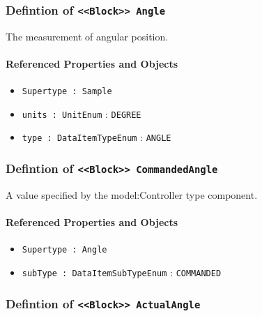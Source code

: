 \subsubsection{Defintion of \texttt{<<Block>> Angle}}
  \label{type:Angle}

\FloatBarrier

The measurement of angular position.

\FloatBarrier
\paragraph{Referenced Properties and Objects}

\begin{itemize}
\item \texttt{Supertype : Sample}

\item \texttt{units : UnitEnum} : \texttt{DEGREE}

\item \texttt{type : DataItemTypeEnum} : \texttt{ANGLE}

\end{itemize}
\FloatBarrier
\subsubsection{Defintion of \texttt{<<Block>> CommandedAngle}}
  \label{type:CommandedAngle}

\FloatBarrier

A value specified by the {model:Controller} type component.

\FloatBarrier
\paragraph{Referenced Properties and Objects}

\begin{itemize}
\item \texttt{Supertype : Angle}

\item \texttt{subType : DataItemSubTypeEnum} : \texttt{COMMANDED}

\end{itemize}
\FloatBarrier
\subsubsection{Defintion of \texttt{<<Block>> ActualAngle}}
  \label{type:ActualAngle}

\FloatBarrier

